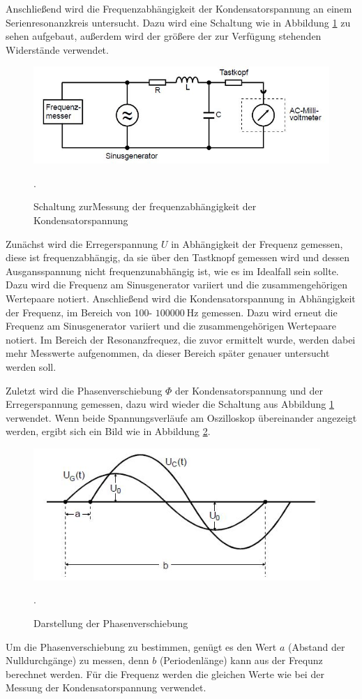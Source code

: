 Anschließend wird die Frequenzabhängigkeit der Kondensatorspannung an einem
Serienresonanzkreis untersucht. Dazu wird eine Schaltung wie in Abbildung
\ref{fig:c} zu sehen aufgebaut, außerdem wird der größere der zur Verfügung
stehenden Widerstände verwendet.
\begin{figure}[H]
  \centering
  \includegraphics[width=13cm]{c.JPG}
  \caption{Schaltung zurMessung der frequenzabhängigkeit der Kondensatorspannung}
  \cite{skript}.
  \label{fig:c}
\end{figure}
Zunächst wird die Erregerspannung $U$ in Abhängigkeit der Frequenz gemessen, diese
ist frequenzabhängig, da sie über den Tastknopf gemessen wird und dessen
Ausgansspannung nicht frequenzunabhängig ist, wie es im Idealfall sein sollte.
Dazu wird die Frequenz am Sinusgenerator
variiert und die zusammengehörigen Wertepaare notiert.
Anschließend wird die Kondensatorspannung in Abhängigkeit der Frequenz, im Bereich
von 100\;- $\SI{100000}{\Hz}$ gemessen. Dazu wird erneut die Frequenz am Sinusgenerator 
variiert und die zusammengehörigen Wertepaare notiert. Im Bereich der Resonanzfrequez,
die zuvor ermittelt wurde, werden dabei mehr Messwerte aufgenommen, da dieser
Bereich später genauer untersucht werden soll.

Zuletzt wird die Phasenverschiebung $\Phi$ der Kondensatorspannung und
der Erregerspannung gemessen, dazu wird wieder die Schaltung aus Abbildung \ref{fig:c}
verwendet. Wenn beide Spannungsverläufe am Oszilloskop übereinander angezeigt werden, ergibt sich ein Bild
wie in Abbildung \ref{fig:phase}.
\begin{figure}[H]
  \centering
  \includegraphics[height=5cm]{phase.JPG}
  \caption{Darstellung der Phasenverschiebung}
  \cite{skript2}.
  \label{fig:phase}
\end{figure}
Um die Phasenverschiebung zu bestimmen, genügt es den Wert $a$ (Abstand der Nulldurchgänge) zu messen, denn
$b$ (Periodenlänge) kann aus der Frequnz berechnet werden. Für die Frequenz werden die gleichen
Werte wie bei der Messung der Kondensatorspannung verwendet.





\label{sec:Durchführung}
